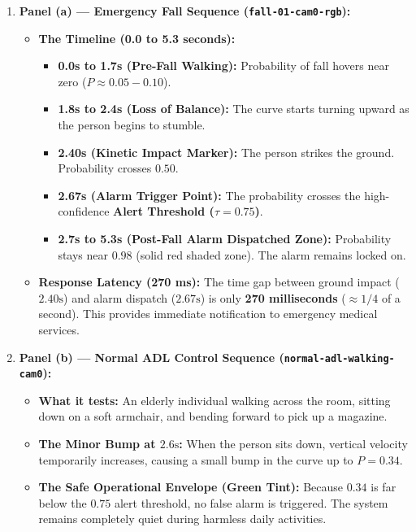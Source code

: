 \documentclass[11pt,a4paper]{article}
\begin{document}
\begin{enumerate}
    \item \textbf{Panel (a) --- Emergency Fall Sequence (\texttt{fall-01-cam0-rgb}):}
    \begin{itemize}
        \item \textbf{The Timeline (0.0 to 5.3 seconds):}
        \begin{itemize}
            \item \textbf{0.0s to 1.7s (Pre-Fall Walking):} Probability of fall hovers near zero ($P \approx 0.05 - 0.10$).
            \item \textbf{1.8s to 2.4s (Loss of Balance):} The curve starts turning upward as the person begins to stumble.
            \item \textbf{2.40s (Kinetic Impact Marker):} The person strikes the ground. Probability crosses $0.50$.
            \item \textbf{2.67s (Alarm Trigger Point):} The probability crosses the high-confidence \textbf{Alert Threshold ($\tau = 0.75$)}.
            \item \textbf{2.7s to 5.3s (Post-Fall Alarm Dispatched Zone):} Probability stays near $0.98$ (solid red shaded zone). The alarm remains locked on.
        \end{itemize}
        \item \textbf{Response Latency (270 ms):} The time gap between ground impact ($2.40\text{s}$) and alarm dispatch ($2.67\text{s}$) is only \textbf{270 milliseconds} ($\approx 1/4$ of a second). This provides immediate notification to emergency medical services.
    \end{itemize}

    \item \textbf{Panel (b) --- Normal ADL Control Sequence (\texttt{normal-adl-walking-cam0}):}
    \begin{itemize}
        \item \textbf{What it tests:} An elderly individual walking across the room, sitting down on a soft armchair, and bending forward to pick up a magazine.
        \item \textbf{The Minor Bump at $2.6\text{s}$:} When the person sits down, vertical velocity temporarily increases, causing a small bump in the curve up to $P = 0.34$.
        \item \textbf{The Safe Operational Envelope (Green Tint):} Because $0.34$ is far below the $0.75$ alert threshold, no false alarm is triggered. The system remains completely quiet during harmless daily activities.
    \end{itemize}
\end{enumerate}
\end{document}
